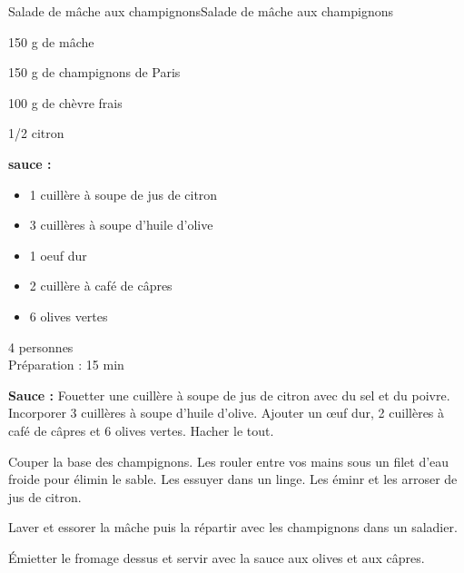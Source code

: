 \begin{recette}{Salade de mâche aux champignons}{Salade de mâche aux champignons}

\begin{ingredients}
150 g de mâche\par
150 g de champignons de Paris\par
100 g de chèvre frais\par
1/2 citron\par
\textbf{ sauce :}\par
\begin{itemize}\par
\item[] 1 cuillère à soupe de jus de citron\par
\item[] 3 cuillères à soupe d'huile d'olive\par
\item[] 1 oeuf dur\par
\item[] 2 cuillère à café de câpres\par
\item[] 6 olives vertes\par
\end{itemize}\par
\end{ingredients}

\begin{infos}
4 personnes\\
Préparation : 15 min\\
\end{infos}

\begin{etapes}
\item \textbf{Sauce :} Fouetter une cuillère à soupe de jus de citron avec du sel et du poivre. Incorporer 3 cuillères à soupe d'huile d'olive. Ajouter un œuf dur, 2 cuillères à café de câpres et 6 olives vertes. Hacher le tout.
\item Couper la base des champignons. Les rouler entre vos mains sous un filet d'eau froide pour élimin le sable. Les essuyer dans un linge. Les éminr et les arroser de jus de citron.
\item Laver et essorer la mâche puis la répartir avec les champignons dans un saladier.
\item Émietter le fromage dessus et servir avec la sauce aux olives et aux câpres.
\end{etapes}

\end{recette}